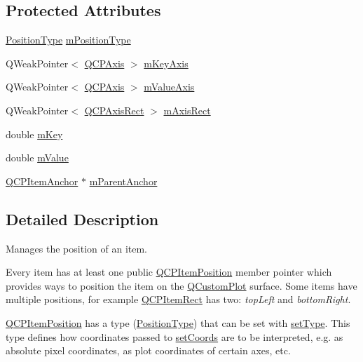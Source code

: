 \subsection*{Protected Attributes}
\begin{DoxyCompactItemize}
\item 
\hyperlink{class_q_c_p_item_position_aad9936c22bf43e3d358552f6e86dbdc8}{Position\-Type} \hyperlink{class_q_c_p_item_position_ac9c7bbca809601323d3ae2542ef2801a}{m\-Position\-Type}
\item 
Q\-Weak\-Pointer$<$ \hyperlink{class_q_c_p_axis}{Q\-C\-P\-Axis} $>$ \hyperlink{class_q_c_p_item_position_a53fa450dbdc43101ef268e04ffbe6765}{m\-Key\-Axis}
\item 
Q\-Weak\-Pointer$<$ \hyperlink{class_q_c_p_axis}{Q\-C\-P\-Axis} $>$ \hyperlink{class_q_c_p_item_position_a65d7581f8030b93a42dd1386d24d0cd5}{m\-Value\-Axis}
\item 
Q\-Weak\-Pointer$<$ \hyperlink{class_q_c_p_axis_rect}{Q\-C\-P\-Axis\-Rect} $>$ \hyperlink{class_q_c_p_item_position_a68295aa2761626cf3b74383f054d25e0}{m\-Axis\-Rect}
\item 
double \hyperlink{class_q_c_p_item_position_a4ff3931ad115603dfb4c7000b24bb415}{m\-Key}
\item 
double \hyperlink{class_q_c_p_item_position_a67bf5df69f587d53731724a7d61c6c3f}{m\-Value}
\item 
\hyperlink{class_q_c_p_item_anchor}{Q\-C\-P\-Item\-Anchor} $\ast$ \hyperlink{class_q_c_p_item_position_a21e37c5a8cabe747a2c60773b23eddeb}{m\-Parent\-Anchor}
\end{DoxyCompactItemize}


\subsection{Detailed Description}
Manages the position of an item. 

Every item has at least one public \hyperlink{class_q_c_p_item_position}{Q\-C\-P\-Item\-Position} member pointer which provides ways to position the item on the \hyperlink{class_q_custom_plot}{Q\-Custom\-Plot} surface. Some items have multiple positions, for example \hyperlink{class_q_c_p_item_rect}{Q\-C\-P\-Item\-Rect} has two\-: {\itshape top\-Left} and {\itshape bottom\-Right}.

\hyperlink{class_q_c_p_item_position}{Q\-C\-P\-Item\-Position} has a type (\hyperlink{class_q_c_p_item_position_aad9936c22bf43e3d358552f6e86dbdc8}{Position\-Type}) that can be set with \hyperlink{class_q_c_p_item_position_aa476abf71ed8fa4c537457ebb1a754ad}{set\-Type}. This type defines how coordinates passed to \hyperlink{class_q_c_p_item_position_aa988ba4e87ab684c9021017dcaba945f}{set\-Coords} are to be interpreted, e.\-g. as absolute pixel coordinates, as plot coordinates of certain axes, etc.

